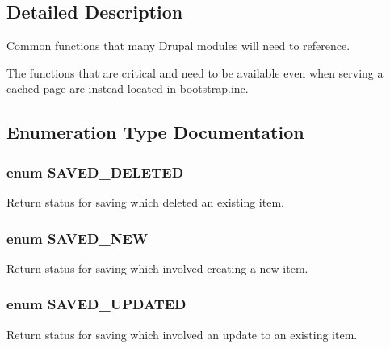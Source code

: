 \subsection{Detailed Description}
Common functions that many Drupal modules will need to reference.

The functions that are critical and need to be available even when serving a cached page are instead located in \hyperlink{bootstrap_8inc}{bootstrap.inc}. 

\subsection{Enumeration Type Documentation}
\hypertarget{common_8inc_38f401ae5a8d3c2f0a06307fa001fff5}{
\subsubsection[{SAVED\_\-DELETED}]{\setlength{\rightskip}{0pt plus 5cm}enum {\bf SAVED\_\-DELETED}}}
\label{common_8inc_38f401ae5a8d3c2f0a06307fa001fff5}


Return status for saving which deleted an existing item. \hypertarget{common_8inc_7d54df6ca81759341e08f451d4f6c8cd}{
\subsubsection[{SAVED\_\-NEW}]{\setlength{\rightskip}{0pt plus 5cm}enum {\bf SAVED\_\-NEW}}}
\label{common_8inc_7d54df6ca81759341e08f451d4f6c8cd}


Return status for saving which involved creating a new item. \hypertarget{common_8inc_7daf0b68ef3b54562e9999ef017e28cb}{
\subsubsection[{SAVED\_\-UPDATED}]{\setlength{\rightskip}{0pt plus 5cm}enum {\bf SAVED\_\-UPDATED}}}
\label{common_8inc_7daf0b68ef3b54562e9999ef017e28cb}


Return status for saving which involved an update to an existing item. 

